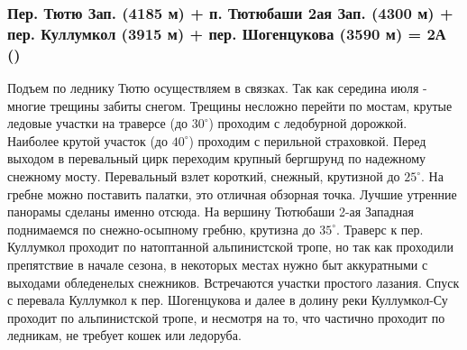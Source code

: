 		\subsubsection*{Пер. Тютю Зап. (4185 м) + п. Тютюбаши 2ая Зап. (4300 м) + пер. Куллумкол (3915 м) + пер. Шогенцукова (3590 м) = 2А ()}
			Подъем по леднику Тютю осуществляем в связках. Так как середина июля - многие трещины забиты снегом.
			Трещины несложно перейти по мостам, крутые ледовые участки на траверсе (до $30^\circ$) проходим с
			ледобурной дорожкой. Наиболее крутой участок (до $40^\circ$) проходим с перильной страховкой. Перед
			выходом в перевальный цирк переходим крупный бергшрунд по надежному снежному мосту. Перевальный взлет
			короткий, снежный, крутизной до $25^\circ$. На гребне можно поставить палатки, это отличная обзорная
			точка. Лучшие утренние панорамы сделаны именно отсюда. На вершину Тютюбаши 2-ая Западная поднимаемся
			по снежно-осыпному гребню, крутизна до $35^\circ$. Траверс к пер. Куллумкол проходит по натоптанной
			альпинистской тропе, но так как проходили препятствие в начале сезона, в некоторых местах нужно быт
			 аккуратными с выходами обледенелых снежников. Встречаются участки простого лазания. Спуск с перевала
			 Куллумкол к пер. Шогенцукова и далее в долину реки Куллумкол-Су проходит по альпинистской тропе, и
			 несмотря на то, что частично проходит по ледникам, не требует кошек или ледоруба.

